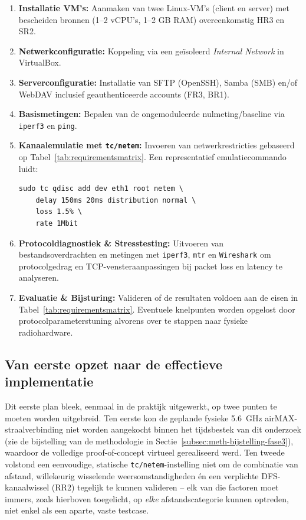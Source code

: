 \begin{enumerate}
  \item \textbf{Installatie VM's:} Aanmaken van twee Linux-VM's (client en server) met bescheiden bronnen (1--2 vCPU's, 1--2 GB RAM) overeenkomstig HR3 en SR2.
  \item \textbf{Netwerkconfiguratie:} Koppeling via een geïsoleerd \textit{Internal Network} in VirtualBox.
  \item \textbf{Serverconfiguratie:} Installatie van SFTP (OpenSSH), Samba (SMB) en/of WebDAV inclusief geauthenticeerde accounts (FR3, BR1).
  \item \textbf{Basismetingen:} Bepalen van de ongemoduleerde nulmeting/baseline via \texttt{iperf3} en \texttt{ping}.
  \item \textbf{Kanaalemulatie met \texttt{tc/netem}:} Invoeren van netwerkrestricties gebaseerd op Tabel~\ref{tab:requirementsmatrix}. Een representatief emulatiecommando luidt:
\begin{verbatim}
sudo tc qdisc add dev eth1 root netem \
    delay 150ms 20ms distribution normal \
    loss 1.5% \
    rate 1Mbit
\end{verbatim}
  \item \textbf{Protocoldiagnostiek \& Stresstesting:} Uitvoeren van bestandsoverdrachten en metingen met \texttt{iperf3}, \texttt{mtr} en \texttt{Wireshark} om protocolgedrag en TCP-vensteraanpassingen bij packet loss en latency te analyseren.
  \item \textbf{Evaluatie \& Bijsturing:} Valideren of de resultaten voldoen aan de eisen in Tabel~\ref{tab:requirementsmatrix}. Eventuele knelpunten worden opgelost door protocolparameterstuning alvorens over te stappen naar fysieke radiohardware.
\end{enumerate}

\subsection{Van eerste opzet naar de effectieve implementatie}%
\label{subsec:req-van-opzet-naar-implementatie}

Dit eerste plan bleek, eenmaal in de praktijk uitgewerkt, op twee punten te moeten worden uitgebreid. Ten eerste kon de geplande fysieke 5.6~GHz airMAX-straalverbinding niet worden aangekocht binnen het tijdsbestek van dit onderzoek (zie de bijstelling van de methodologie in Sectie~\ref{subsec:meth-bijstelling-fase3}), waardoor de volledige proof-of-concept virtueel gerealiseerd werd. Ten tweede volstond een eenvoudige, statische \texttt{tc/netem}-instelling niet om de combinatie van afstand, willekeurig wisselende weersomstandigheden én een verplichte DFS-kanaalwissel (RR2) tegelijk te kunnen valideren -- elk van die factoren moet immers, zoals hierboven toegelicht, op \emph{elke} afstandscategorie kunnen optreden, niet enkel als een aparte, vaste testcase.

